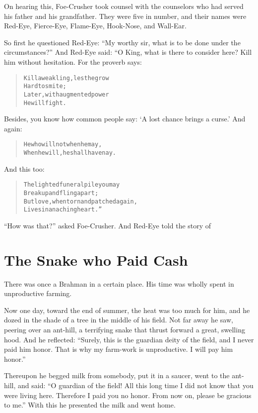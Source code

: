 \documentclass[article, twoside, 14pt]{memoir}
\renewenvironment{verbatim}{%
\begin{quote}%
\vskip -10pt%
\begin{alltt}\normalfont\large}{\end{alltt}%
\end{quote}%
\vskip -10pt
} %
\begin{document}
On hearing this, Foe-Crusher took counsel with the counselors who
had served his father and his grandfather. They were five in
number, and their names were Red-Eye, Fierce-Eye, Flame-Eye,
Hook-Nose, and Wall-Ear.

So first he questioned Red-Eye:
``My worthy sir, what is to be done under the circumstances?'' And
Red-Eye said: “O King, what is there to consider here? Kill him
without hesitation. For the proverb says:

\begin{verbatim}
Kill a weakling, lest he grow
    Hard to smite;
Later, with augmented power
    He will fight.
\end{verbatim}
Besides, you know how common people say:
`A lost chance brings a curse.' And again:

\begin{verbatim}
He who will not when he may,
When he will, he shall have nay.
\end{verbatim}
And this too:

\begin{verbatim}
The lighted funeral pile you may
    Break up and fling apart;
But love, when torn and patched again,
    Lives in an aching heart.”
\end{verbatim}
``How was that?'' asked Foe-Crusher. And Red-Eye told the story of

\chapter{The Snake who Paid Cash}

\label{s53}

There was once a Brahman in a certain place. His time was wholly
spent in unproductive farming.

Now one day, toward the end of summer, the heat was too much for
him, and he dozed in the shade of a tree in the middle of his
field. Not far away he saw, peering over an ant-hill, a terrifying
snake that thrust forward a great, swelling hood. And he reflected:
``Surely, this is the guardian deity of the field, and I never paid him honor. That is why my farm-work is unproductive. I will pay him honor.''

Thereupon he begged milk from somebody, put it in a saucer, went to
the ant-hill, and said:
``O guardian of the field! All this long time I did not know that you were living here. Therefore I paid you no honor. From now on, please be gracious to me.''
With this he presented the milk and went home.
\end{document}
